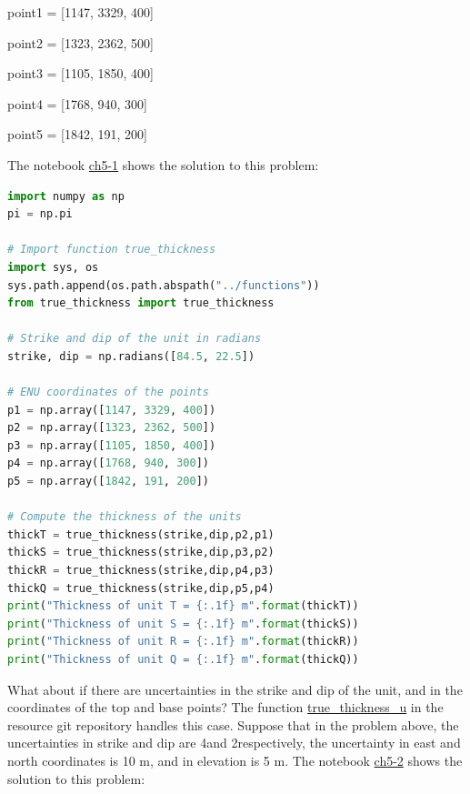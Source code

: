 \documentclass[a4paper , 12pt]{book}
\begin{document}
point1 = [1147, 3329, 400]

point2 = [1323, 2362, 500]

point3 = [1105, 1850, 400]

point4 = [1768, 940, 300]

point5 = [1842, 191, 200]

The notebook \href{https://github.com/nfcd/compGeo/blob/master/source/notebooks/ch5-1.ipynb}{ch5-1} shows the solution to this problem:

\begin{center}
\begin{lstlisting}[language=Python, frame=single]
import numpy as np
pi = np.pi

# Import function true_thickness
import sys, os
sys.path.append(os.path.abspath("../functions"))
from true_thickness import true_thickness

# Strike and dip of the unit in radians
strike, dip = np.radians([84.5, 22.5]) 

# ENU coordinates of the points
p1 = np.array([1147, 3329, 400]) 
p2 = np.array([1323, 2362, 500]) 
p3 = np.array([1105, 1850, 400]) 
p4 = np.array([1768, 940, 300]) 
p5 = np.array([1842, 191, 200])

# Compute the thickness of the units
thickT = true_thickness(strike,dip,p2,p1)
thickS = true_thickness(strike,dip,p3,p2)
thickR = true_thickness(strike,dip,p4,p3)
thickQ = true_thickness(strike,dip,p5,p4)
print("Thickness of unit T = {:.1f} m".format(thickT))
print("Thickness of unit S = {:.1f} m".format(thickS))
print("Thickness of unit R = {:.1f} m".format(thickR))
print("Thickness of unit Q = {:.1f} m".format(thickQ))
\end{lstlisting}
\end{center}

What about if there are uncertainties in the strike and dip of the unit, and in the coordinates of the top and base points? The function \href{https://github.com/nfcd/compGeo/blob/master/source/functions/true_thickness_u.py}{true\_thickness\_u} in the resource git repository handles this case. Suppose that in the problem above, the uncertainties in strike and dip are 4\degree\space and 2\degree\space respectively, the uncertainty in east and north coordinates is 10 m, and in elevation is 5 m. The notebook \href{https://github.com/nfcd/compGeo/blob/master/source/notebooks/ch5-2.ipynb}{ch5-2} shows the solution to this problem:
\end{document}
